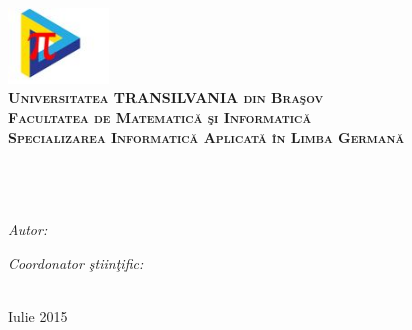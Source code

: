 \begin{titlepage}
\begin{center}
\includegraphics[width=0.2\textwidth]{./Pictures/LOGO.JPEG}\\[0.5cm]
\textsc{\LARGE \textbf{Universitatea TRANSILVANIA din Bra\c sov }}\\[0.5cm]
\textsc{\LARGE \textbf{Facultatea de Matematic\u a \c si Informatic\u a }}\\[0.5cm]
\textsc{\Large \textbf{Specializarea Informatic\u a Aplicat\u a \^ in Limba German\u a}}\\[3cm]

\HRule \\[0.4cm] %
{\large \bfseries \ttitle}\\[0.4cm] %
\HRule \\[1.5cm] %
 
\begin{minipage}{0.4\textwidth}
\begin{flushleft} \large
\emph{Autor:}\\
\authornames %
\end{flushleft}
\end{minipage}
\begin{minipage}{0.4\textwidth}
\begin{flushright} \large
\emph{Coordonator \c stiin\c tific:} \\
\supname %
\end{flushright}
\end{minipage}\\[8cm]
 


{\large Iulie 2015}\\[4cm] %
 
\vfill
\end{center}

\end{titlepage}

